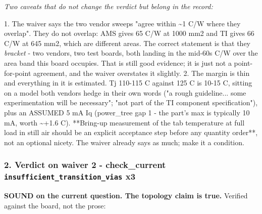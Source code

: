 \documentclass[11pt,a4paper]{article}
\begin{document}
\emph{Two caveats that do not change the verdict but belong in the record:}

1. The waiver says the two vendor sweeps "agree within \textasciitilde{}1 C/W where they overlap". They do not overlap: AMS gives 65 C/W at 1000 mm2 and TI gives 66 C/W at 645 mm2, which are different areas. The correct statement is that they \emph{bracket} - two vendors, two test boards, both landing in the mid-60s C/W over the area band this board occupies. That is still good evidence; it is just not a point-for-point agreement, and the waiver overstates it slightly. 2. The margin is thin and everything in it is estimated. Tj 110-115 C against 125 C is 10-15 C, sitting on a model both vendors hedge in their own words ("a rough guideline... some experimentation will be necessary"; "not part of the TI component specification"), plus an ASSUMED 5 mA Iq (power\_tree gap 1 - the part's max is typically 10 mA, worth \textasciitilde{}+1.6 C). {*}{*}Bring-up measurement of the tab temperature at full load in still air should be an explicit acceptance step before any quantity order{*}{*}, not an optional nicety. The waiver already says as much; make it a condition.

\subsubsection*{2. Verdict on waiver 2 - check\_current \texttt{insufficient\_transition\_vias} x3}
\textbf{SOUND on the current question. The topology claim is true.} Verified against the board, not the prose:
\end{document}
